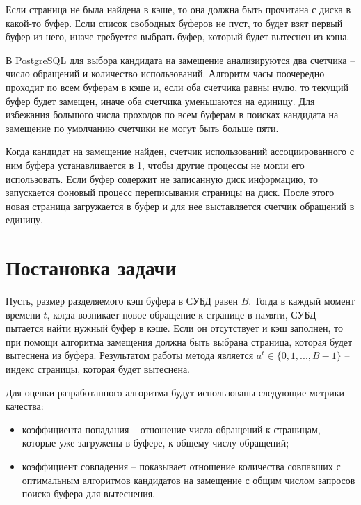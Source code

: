 Если страница не была найдена в кэше, то она должна быть прочитана с диска в какой-то буфер.
Если список свободных буферов не пуст, то будет взят первый буфер из него, иначе требуется выбрать буфер, который будет вытеснен из кэша.

В PostgreSQL для выбора кандидата на замещение анализируются два счетчика -- число обращений и количество использований.
Алгоритм часы поочередно проходит по всем буферам в кэше и, если оба счетчика равны нулю, то текущий буфер будет замещен, иначе оба счетчика уменьшаются на единицу.
Для избежания большого числа проходов по всем буферам в поисках кандидата на замещение по умолчанию счетчики не могут быть больше пяти.

Когда кандидат на замещение найден, счетчик использований ассоциированного с ним буфера устанавливается в 1, чтобы другие процессы не могли его использовать.
Если буфер содержит не записанную диск информацию, то запускается фоновый процесс переписывания страницы на диск.
После этого новая страница загружается в буфер и для нее выставляется счетчик обращений в единицу.

\section{Постановка задачи}
Пусть, размер разделяемого кэш буфера в СУБД равен $B$.
Тогда в каждый момент времени $t$, когда возникает новое обращение к странице в памяти, СУБД пытается найти нужный буфер в кэше.
Если он отсутствует и кэш заполнен, то при помощи алгоритма замещения должна быть выбрана страница, которая будет вытеснена из буфера.
Результатом работы метода является $a^t \in \{0, 1, ..., B-1\}$ -- индекс страницы, которая будет вытеснена.

Для оценки разработанного алгоритма будут использованы следующие метрики качества:
\begin{itemize}
	\item коэффициента попадания -- отношение числа обращений к страницам, которые уже загружены в буфере, к общему числу обращений;
	\item коэффициент совпадения -- показывает отношение количества совпавших с оптимальным алгоритмов кандидатов на замещение с общим числом запросов поиска буфера для вытеснения.
\end{itemize}

